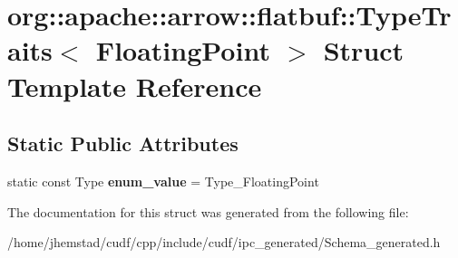 \hypertarget{structorg_1_1apache_1_1arrow_1_1flatbuf_1_1TypeTraits_3_01FloatingPoint_01_4}{}\section{org\+:\+:apache\+:\+:arrow\+:\+:flatbuf\+:\+:Type\+Traits$<$ Floating\+Point $>$ Struct Template Reference}
\label{structorg_1_1apache_1_1arrow_1_1flatbuf_1_1TypeTraits_3_01FloatingPoint_01_4}
\subsection*{Static Public Attributes}
\begin{DoxyCompactItemize}
\item 
static const Type {\bfseries enum\+\_\+value} = Type\+\_\+\+Floating\+Point\hypertarget{structorg_1_1apache_1_1arrow_1_1flatbuf_1_1TypeTraits_3_01FloatingPoint_01_4_af906aa5c90b42e4366162a89bddf2080}{}\label{structorg_1_1apache_1_1arrow_1_1flatbuf_1_1TypeTraits_3_01FloatingPoint_01_4_af906aa5c90b42e4366162a89bddf2080}

\end{DoxyCompactItemize}


The documentation for this struct was generated from the following file\+:\begin{DoxyCompactItemize}
\item 
/home/jhemstad/cudf/cpp/include/cudf/ipc\+\_\+generated/Schema\+\_\+generated.\+h\end{DoxyCompactItemize}
